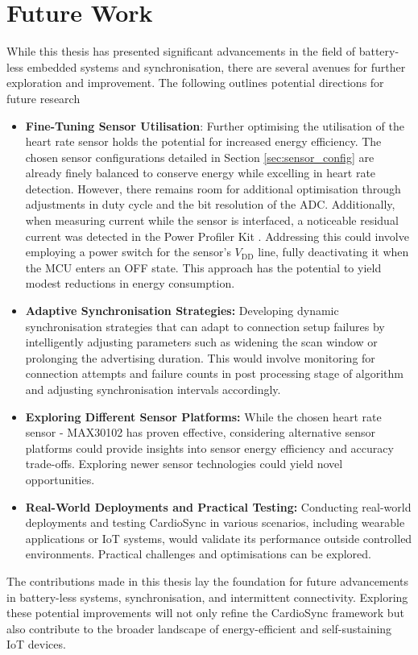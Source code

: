 \chapter{Future Work}
\label{chp:futurework}

While this thesis has presented significant advancements in the field of battery-less embedded systems and synchronisation, there are several avenues for further exploration and improvement. The following outlines potential directions for future research

\begin{itemize}
    \item \textbf{Fine-Tuning Sensor Utilisation}: Further optimising the utilisation of the heart rate sensor holds the potential for increased energy efficiency. The chosen sensor configurations detailed in Section \ref{sec:sensor_config} are already finely balanced to conserve energy while excelling in heart rate detection. However, there remains room for additional optimisation through adjustments in duty cycle and the bit resolution of the ADC. Additionally, when measuring current while the sensor is interfaced, a noticeable residual current was detected in the Power Profiler Kit \cite{2023Power}. Addressing this could involve employing a power switch for the sensor's $V_\text{DD}$ line, fully deactivating it when the MCU enters an OFF state. This approach has the potential to yield modest reductions in energy consumption.

    \item \textbf{Adaptive Synchronisation Strategies:} Developing dynamic synchronisation strategies that can adapt to connection setup failures by intelligently adjusting parameters such as widening the scan window or prolonging the advertising duration. This would involve monitoring for connection attempts and failure counts in post processing stage of algorithm and adjusting synchronisation intervals accordingly.

    \item \textbf{Exploring Different Sensor Platforms: }While the chosen heart rate sensor - MAX30102 has proven effective, considering alternative sensor platforms could provide insights into sensor energy efficiency and accuracy trade-offs. Exploring newer sensor technologies could yield novel opportunities.

    \item \textbf{Real-World Deployments and Practical Testing:} Conducting real-world deployments and testing CardioSync in various scenarios, including wearable applications or IoT systems, would validate its performance outside controlled environments. Practical challenges and optimisations can be explored.
\end{itemize}

\noindent The contributions made in this thesis lay the foundation for future advancements in battery-less systems, synchronisation, and intermittent connectivity. Exploring these potential improvements will not only refine the CardioSync framework but also contribute to the broader landscape of energy-efficient and self-sustaining IoT devices.